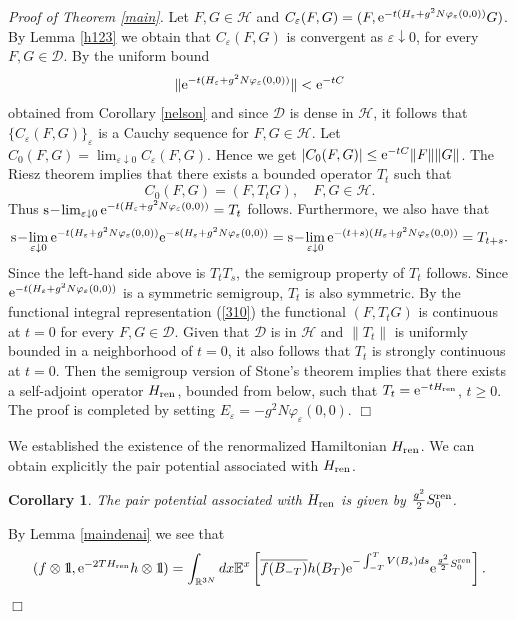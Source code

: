 \documentclass[12pt]{article}
\newtheorem{corollary}[theorem]{Corollary}
\providecommand{\bc}[1]{\begin{corollary}\label{#1}}
\providecommand{\ec}{\end{corollary}}
\def\bbbone{{\mathchoice {\rm 1\mskip-4mu l} {\rm 1\mskip-4mu l}
{\rm 1\mskip-4.5mu l} {\rm 1\mskip-5mu l}}}
\def\one{\bbbone}
\newcommand{\Ebb}{{\mathbb E}}
\providecommand{\eq}[1]{\begin{equation}\label{#1}}
\providecommand{\en}{\end{equation}}
\providecommand{\qed}{\hfill {$\Box$}\par\medskip}
\providecommand{\BRN}{{\mathbb{R}^{3N} }}
\providecommand{\kak}[1]{(\ref{#1})}
\providecommand{\hni}{\hn_\ren }
\providecommand{\D}{{\ms D}}
\providecommand{\hn}{H}%
\providecommand{\ms}[1]{\mathscr{#1}}
\providecommand{\ov}[1]{\overline{#1}}
\providecommand{\hhh}{\ms H} %
\providecommand{\slim}{{\rm s}\!-\!\lim}
\providecommand{\e}{{\rm e}}
\providecommand{\1}{\mathbb{1}}
\providecommand {\D}  {\ensuremath {\mathcal{D}}}
\providecommand{\eps}{\varepsilon}
\providecommand{\ren}{{\rm ren}}
\begin{document}
\medskip
\noindent
\emph{Proof of Theorem \ref{main}.}
Let $F, G\in \hhh$ and $C_\eps(F,G)=(F, \e^{-t(H_\eps+g^2N\varphi_\eps(0,0))}G)$. By Lemma \ref{h123} we
obtain that $C_\eps(F,G)$ is convergent as $\eps\downarrow0$, for every $F,G\in\D$. By the uniform bound
$$
\|\e^{-t(H_\eps+g^2N\varphi_\eps(0,0))}\|<\e^{-tC}
$$
obtained from Corollary  \ref{nelson} and since $\D$ is dense in $\hhh$, it follows that
$\{C_\eps(F,G)\}_\eps$ is a Cauchy sequence for $F,G\in\hhh$. Let $C_0(F,G)=\lim_{\eps\downarrow 0}C_\eps(F,G)$.
Hence we get $|C_0(F,G)|\leq \e^{-tC}\|F\|\|G\|$. The Riesz theorem implies that there exists a bounded operator
$T_t$ such that
$$
C_0(F,G)=(F, T_t G),\quad F,G\in \hhh.
$$
Thus $\slim_{\eps\downarrow 0}\e^{-t(\hn_\eps+g^2N\varphi_\eps(0,0))}=T_t$ follows. Furthermore, we also have
that
$$
\slim_{\eps\downarrow 0} \e^{-t(\hn_\eps+g^2N\varphi_\eps(0,0))}
\e^{-s(\hn_\eps+g^2N\varphi_\eps(0,0))}=\slim_{\eps\downarrow 0}
\e^{-(t+s)(\hn_\eps+g^2N\varphi_\eps(0,0))}=T_{t+s}.
$$
Since the left-hand side above is $T_t T_s$, the semigroup property of $T_t$ follows. Since
$\e^{-t(\hn_\eps+g^2N\varphi_\eps(0,0))}$ is a symmetric semigroup, $T_t$ is also symmetric. By
the functional integral representation \kak{310} the functional $(F, T_t G)$ is continuous at $t=0$
for every $F, G \in \D$. Given that $\D$ is in $\hhh$ and $\|T_t\|$ is uniformly bounded in a
neighborhood of  $t=0$, it also follows that  $T_t$ is strongly continuous at $t=0$. Then the
semigroup version of Stone's theorem \cite[Proposition 3.26]{lhb11} implies that there exists a
self-adjoint operator $\hni$, bounded from below, such that
$T_t=\e^{-t\hni}$, $t\geq0$.  The proof is
completed by setting $E_\eps=-g^2N\varphi_\eps(0,0)$.
\qed
We established the existence of the renormalized Hamiltonian $H_\ren$. We can obtain explicitly
the pair potential associated with $H_\ren$.
\bc{pair potential}
The pair potential associated with $\hni$ is given by $\frac{g^2}{2}S_0^\ren $.
\ec
\proof
By Lemma \ref{maindenai} we see that
\eq{sasa212}
(f\otimes \one, \e^{-2T\hni} h\otimes \one)
=\int_{\BRN} dx  \Ebb^x \left[\ov{f(B_{-T})} h(B_T)\e^{-\int_{-T}^T V(B_s) ds} \e^{\frac{g^2}{2} S_0^\ren}
\right].
\en
\qed
\end{document}
